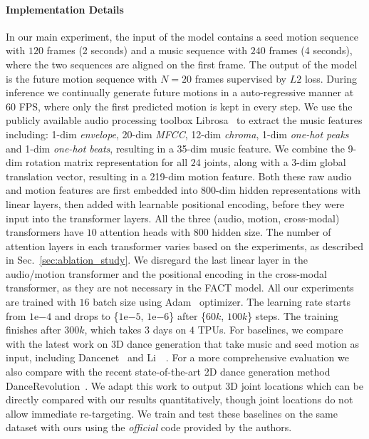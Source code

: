 \vspace{-3mm}
\paragraph{Implementation Details}
In our main experiment, the input of the model contains a seed motion sequence with $120$ frames (2 seconds) and a music sequence with $240$ frames (4 seconds), where the two sequences are aligned on the first frame. The output of the model is the future motion sequence with $N=20$ frames supervised by $L2$ loss.
During inference we continually generate future motions in a auto-regressive manner at $60$ FPS, where only the first predicted motion is kept in every step.
We use the publicly available audio processing toolbox Librosa~\cite{mcfee2015librosa} to extract the music features including: 1-dim \emph{envelope}, 20-dim \emph{MFCC}, 12-dim \emph{chroma}, 1-dim \emph{one-hot peaks} and 1-dim \emph{one-hot beats}, 
resulting in a 35-dim music feature. 
We combine the 9-dim rotation matrix representation for all $24$ joints, along with a 3-dim global translation vector, resulting in a 219-dim motion feature. Both these raw audio and motion features are first embedded into $800$-dim hidden representations with linear layers, then added with learnable positional encoding, before they were input into the transformer layers.
All the three (audio, motion, cross-modal) transformers have $10$ attention heads with $800$ hidden size. The number of attention layers in each transformer varies based on the experiments, as described in Sec.~\ref{sec:ablation_study}. 
We disregard the last linear layer in the audio/motion transformer and the positional encoding in the cross-modal transformer, as they are not necessary in the FACT model.
All our experiments are trained with $16$ batch size using Adam~\cite{kingma2014adam} optimizer. 
The learning rate starts from $1\mathrm{e}{-4}$ and drops to \{$1\mathrm{e}{-5}$, $1\mathrm{e}{-6}$\} after \{$60k$, $100k$\} steps. The training finishes after $300k$, which takes $3$ days on $4$ TPUs. 
For baselines, we compare with the latest work on 3D dance generation that take music and seed motion as input,
including Dancenet~\cite{zhuang2020music2dance} and Li~\etal~\cite{li2020learning}. For a more comprehensive evaluation we also compare with the recent state-of-the-art 2D dance generation method DanceRevolution~\cite{huang2021}. We adapt this work to output 3D joint locations which can be directly compared with our results quantitatively, though joint locations do not allow immediate re-targeting.
We train and test these baselines on the same dataset with ours using the \emph{official} code provided by the authors.



